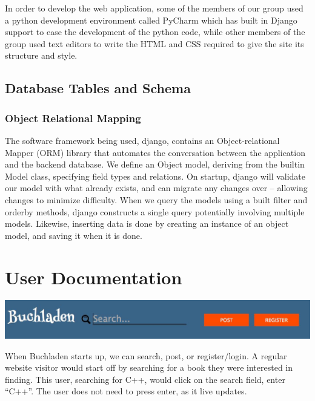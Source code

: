 \documentclass[11pt]{article}
\begin{document}
In order to develop the web application, some of the members of our
group used a python development environment called PyCharm which has
built in Django support to ease the development of the python
code, while other members of the group used text editors to write the
HTML and CSS required to give the site its structure and style.


\subsection{Database Tables and Schema}
\label{sec:database-schema}


\subsubsection{Object Relational Mapping}
\label{sec:orm}

The software framework being used, django, contains an
Object-relational Mapper (ORM) library that automates the conversation
between the application and the backend database. We define an Object
model, deriving from the builtin Model class, specifying field types
and relations. On startup, django will validate our model with what
already exists, and can migrate any changes over – allowing changes to
minimize difficulty. When we query the models using a built filter and
orderby methods, django constructs a single query potentially
involving multiple models. Likewise, inserting data is done by
creating an instance of an object model, and saving it when it is
done.

\newpage
\section{User Documentation}
\label{sec:user-docs}

\centerline{\includegraphics[scale=0.3]{./images/walkthrough-1.jpg}}

\vspace{0.1in}

When Buchladen starts up, we can search, post, or register/login.  A
regular website visitor would start off by searching for a book they
were interested in finding.  This user, searching for C++, would click
on the search field, enter ``C++''. The user does not need to press
enter, as it live updates.
\end{document}
